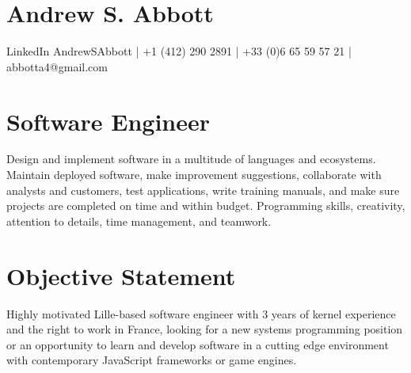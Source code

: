 \documentclass[letterpaper,10pt]{article}
\begin{document}
\pagestyle{empty}

\large\section{Andrew S. Abbott}
\normalsize
\begin{center}
  LinkedIn AndrewSAbbott |
  +1 (412) 290 2891 |
  +33 (0)6 65 59 57 21 |
  abbotta4@gmail.com\par
\end{center}

\section{Software Engineer}
Design and implement software in a multitude of languages and ecosystems. Maintain deployed software, make improvement suggestions, collaborate with analysts and customers, test applications, write training manuals, and make sure projects are completed on time and within budget. Programming skills, creativity, attention to details, time management, and teamwork.

\section{Objective Statement}
Highly motivated Lille-based software engineer with 3 years of kernel experience and the right to work in France, looking for a new systems programming position or an opportunity to learn and develop software in a cutting edge environment with contemporary JavaScript frameworks or game engines.
\end{document}

